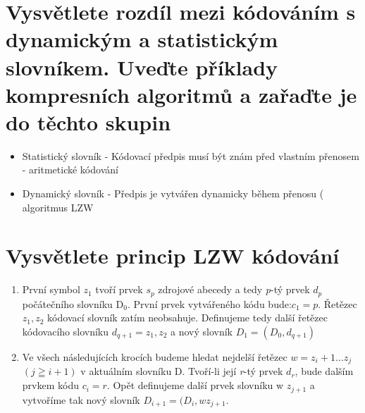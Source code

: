\section{Vysvětlete rozdíl mezi kódováním s dynamickým a statistickým slovníkem. Uveďte příklady kompresních algoritmů a zařaďte je do těchto skupin}
\begin{itemize}
    \item  Statistický slovník - Kódovací předpis musí být znám před vlastním přenosem - aritmetické kódování
    \item Dynamický slovník - Předpis je vytvářen dynamicky během přenosu ( algoritmus LZW
\end{itemize}

\section{Vysvětlete princip LZW kódování}
\begin{enumerate}
    \item První symbol $z_1$ tvoří prvek $s_p$ zdrojové abecedy a tedy \emph{p}-tý prvek $d_p$ počátečního slovníku D$_0$.
    První prvek vytvářeného kódu bude:$c_1 = p$.
    Řetězec $z_1, z_2$ kódovací slovník zatím neobsahuje.
    Definujeme tedy další řetězec kódovacího slovníku $d_{q+1} = z_1, z_2$ a nový slovník $D_1=(D_0,d_{q+1}) $
    \item Ve všech následujících krocích budeme hledat nejdelší řetězec $w = z_i+1\dots z_j$ $(j\geqq i+1)$ v aktuálním slovníku D.
    Tvoří-li její \emph{r}-tý prvek $d_r$, bude dalším prvkem kódu $c_i=r$. 
    Opět definujeme další prvek slovníku w $z_{j+1}$ a vytvoříme tak nový slovník $D_{i+1} = (D_i, w\mathrm{ }z_{j+1}$.
\end{enumerate}